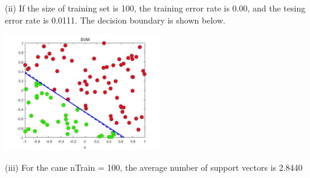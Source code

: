 \documentclass[11pt]{article} %
\begin{document}
(ii) If the size of training set is 100, the training error rate is 0.00, and the tesing error rate is 0.0111. The decision boundary is shown below.

\begin{center}
\includegraphics[height=2in]{./SVM_ii.jpg}
\end{center} 

(iii) For the cane nTrain = 100, the average number of support vectors is 2.8440
\end{document}
